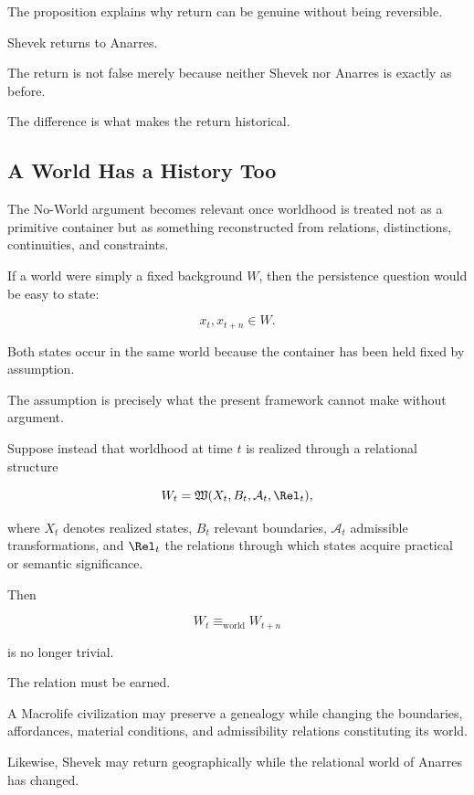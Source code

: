 \documentclass[
  11pt,
  a4paper,
  DIV=12,
  BCOR=0mm,
  parskip=half-
]{scrartcl}
\newcommand{\Adm}{\mathcal A}
\newcommand{\eqworld}{%
  \equiv_{\mathrm{world}}%
}
\theoremstyle{definition}
\theoremstyle{plain}
\theoremstyle{remark}
\begin{document}
The proposition explains why return can be genuine without being reversible.

Shevek returns to Anarres.

The return is not false merely because neither Shevek nor Anarres is exactly
as before.

The difference is what makes the return historical.


\subsection{A World Has a History Too}
\label{sec:world-provenance}

The No-World argument becomes relevant once worldhood is treated not as a
primitive container but as something reconstructed from relations,
distinctions, continuities, and constraints.

If a world were simply a fixed background \(W\), then the persistence question
would be easy to state:

\[
  x_t,x_{t+n}\in W.
\]

Both states occur in the same world because the container has been held fixed
by assumption.

The assumption is precisely what the present framework cannot make without
argument.

Suppose instead that worldhood at time \(t\) is realized through a relational
structure

\[
  W_t
  =
  \mathfrak W
  (
  X_t,
  B_t,
  \Adm_t,
  \Rel_t
  ),
\]

where \(X_t\) denotes realized states, \(B_t\) relevant boundaries,
\(\Adm_t\) admissible transformations, and \(\Rel_t\) the relations through
which states acquire practical or semantic significance.

Then

\[
  W_t\eqworld W_{t+n}
\]

is no longer trivial.

The relation must be earned.

A Macrolife civilization may preserve a genealogy while changing the
boundaries, affordances, material conditions, and admissibility relations
constituting its world.

Likewise, Shevek may return geographically while the relational world of
Anarres has changed.
\end{document}
